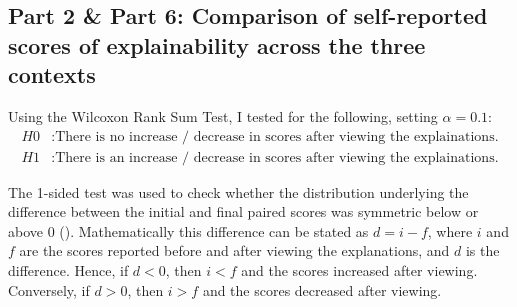 \subsection{Part 2 \& Part 6: Comparison of self-reported scores of explainability across the three contexts}
Using the Wilcoxon Rank Sum Test, I tested for the following, setting $\alpha = 0.1$: 
\begin{align*}
    H0&: \text{There is no increase / decrease in scores after viewing the explainations.} \\
    H1&: \text{There is an increase / decrease in scores after viewing the explainations.}
\end{align*}

The 1-sided test was used to check whether the distribution underlying the difference between the initial and final paired scores was symmetric below or above 0 (\cite{scipy}). Mathematically this difference can be stated as $d = i - f$, where $i$ and $f$ are the scores reported before and after viewing the explanations, and $d$ is the difference. Hence, if $d < 0$, then $i < f$ and the scores increased after viewing. Conversely, if $d > 0$, then $i > f$ and the scores decreased after viewing.

\begin{table}[!ht]
    \centering
    \caption{p-values comparing whether there was a statistically significant increase / decrease in the explainability scores before and after viewing explanations.}
    \label{tab:context_comparison}
\end{table}

